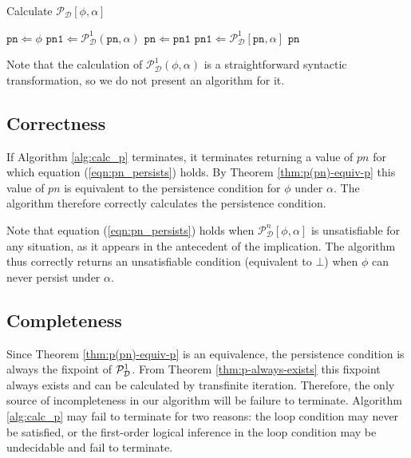%
\begin{algorithm}
\caption{Calculate $\mathcal{P}_{\mathcal{D}}[\phi,\alpha]$}


\label{alg:calc_p} \begin{algorithmic} \STATE $\mathtt{pn}\Leftarrow\phi$
\STATE $\mathtt{pn1}\Leftarrow\mathcal{P}_{\mathcal{D}}^{1}(\mathtt{pn},\alpha)$
\STATE $\mathtt{pn}\Leftarrow\mathtt{pn1}$ \STATE $\mathtt{pn1}\Leftarrow\mathcal{P}_{\mathcal{D}}^{1}[\mathtt{pn},\alpha]$
\ENDWHILE \RETURN $\mathtt{pn}$ \end{algorithmic} 
\end{algorithm}


Note that the calculation of $\mathcal{P}_{\mathcal{D}}^{1}(\phi,\alpha)$
is a straightforward syntactic transformation, so we do not present
an algorithm for it.


\subsection{Correctness}

If Algorithm \ref{alg:calc_p} terminates, it terminates returning
a value of $pn$ for which equation (\ref{eqn:pn_persists}) holds.
By Theorem \ref{thm:p(pn)-equiv-p} this value of $pn$ is equivalent
to the persistence condition for $\phi$ under $\alpha$. The algorithm
therefore correctly calculates the persistence condition.

Note that equation (\ref{eqn:pn_persists}) holds when $\mathcal{P}_{\mathcal{D}}^{n}[\phi,\alpha]$
is unsatisfiable for any situation, as it appears in the antecedent
of the implication. The algorithm thus correctly returns an unsatisfiable
condition (equivalent to $\bot$) when $\phi$ can never persist under
$\alpha$.


\subsection{Completeness}

Since Theorem \ref{thm:p(pn)-equiv-p} is an equivalence, the persistence
condition is always the fixpoint of $\mathcal{P}^{1}_{\mathcal{D}}$. From Theorem \ref{thm:p-always-exists}
this fixpoint always exists and can be calculated by transfinite iteration.
Therefore, the only source of incompleteness in our algorithm will
be failure to terminate. Algorithm \ref{alg:calc_p} may fail to terminate
for two reasons: the loop condition may never be satisfied, or the
first-order logical inference in the loop condition may be undecidable
and fail to terminate.

